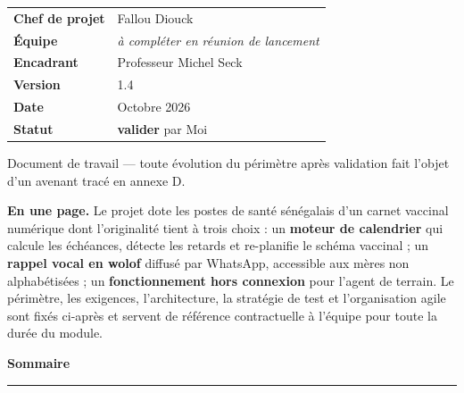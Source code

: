 \documentclass[11pt,a4paper]{article}
\renewcommand{\arraystretch}{1.35}
\begin{document}
\begin{titlepage}
\vfill

\noindent
\begingroup\renewcommand{\arraystretch}{1.55}%
\begin{tabular}{@{}>{\sffamily\bfseries\footnotesize\color{primary}}l@{\hspace{1.4cm}}>{\footnotesize}l@{}}
  Chef de projet   & Fallou Diouck \\
  Équipe           & \textit{à compléter en réunion de lancement} \\
  Encadrant        & Professeur Michel Seck \\
  Version          & 1.4 \\
  Date             & Octobre 2026 \\
  Statut           & \textcolor{amber}{\sffamily\bfseries valider} par Moi \\
\end{tabular}\endgroup

\vspace{1.4cm}
{\centering\sffamily\scriptsize\color{neutral}
  Document de travail — toute évolution du périmètre après validation fait l'objet d'un avenant tracé en annexe D.\par}
\vspace{1.2cm}
\end{titlepage}

\setcounter{page}{1}

\begin{synthese}
{\sffamily\bfseries\color{primary}En une page.}\;
Le projet dote les postes de santé sénégalais d'un carnet vaccinal numérique dont
l'originalité tient à trois choix : un \textbf{moteur de calendrier} qui calcule les
échéances, détecte les retards et re-planifie le schéma vaccinal ; un \textbf{rappel
vocal en wolof} diffusé par WhatsApp, accessible aux mères non alphabétisées ; un
\textbf{fonctionnement hors connexion} pour l'agent de terrain. Le périmètre, les
exigences, l'architecture, la stratégie de test et l'organisation agile sont fixés
ci-après et servent de référence contractuelle à l'équipe pour toute la durée du module.
\end{synthese}

\vspace{4mm}
{\sffamily\Large\bfseries\color{primary}Sommaire}\\[-2mm]
{\color{accent}\rule{\textwidth}{1.2pt}}
\vspace{-2mm}
\renewcommand{\contentsname}{}
\setcounter{tocdepth}{2}
\tableofcontents
\end{document}
